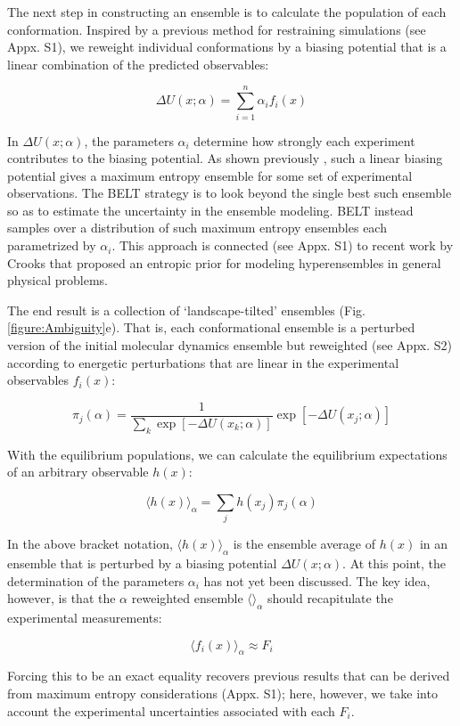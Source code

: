 \documentclass[12pt]{article}
\begin{document}
The next step in constructing an ensemble is to calculate the population of each conformation.  Inspired by a previous method for restraining simulations  \cite{chodera2012} (see Appx. S1), we reweight individual conformations by a biasing potential that is a linear combination of the predicted observables:

$$\Delta U(x;\alpha) = \sum_{i=1}^n \alpha_i f_i(x)$$

In $\Delta U(x;\alpha)$, the parameters $\alpha_i$ determine how strongly each experiment contributes to the biasing potential.  As shown previously \cite{chodera2012}, such a linear biasing potential gives a maximum entropy ensemble for some set of experimental observations. The BELT strategy is to look beyond the single best such ensemble so as to estimate the uncertainty in the ensemble modeling. BELT instead samples over a distribution of such maximum entropy ensembles each parametrized by $\alpha_i$. This approach is connected (see Appx. S1) to recent work by Crooks that proposed an entropic prior for modeling hyperensembles in general physical problems. 

The end result is a collection of `landscape-tilted' ensembles (Fig. \ref{figure:Ambiguity}e). That is, each conformational ensemble is a perturbed version of the initial molecular dynamics ensemble but reweighted (see Appx. S2) according to energetic perturbations that are linear in the experimental observables $f_i(x)$:

$$\pi_j(\alpha) = \frac{1}{\sum_k \exp[-\Delta U(x_k;\alpha)]} \exp[-\Delta U(x_j;\alpha)]$$

With the equilibrium populations, we can calculate the equilibrium expectations of an arbitrary observable $h(x)$:

$$\langle h(x)\rangle _\alpha = \sum_j h(x_j) \pi_j(\alpha)$$

In the above bracket notation, $\langle h(x)\rangle _\alpha$ is the ensemble average of $h(x)$ in an ensemble that is perturbed by a biasing potential $\Delta U(x;\alpha)$.  At this point, the determination of the parameters $\alpha_i$ has not yet been discussed.  The key idea, however, is that the $\alpha$ reweighted ensemble $\langle \rangle _\alpha$ should recapitulate the experimental measurements:

$$\langle f_i(x)\rangle _\alpha \approx F_i$$

Forcing this to be an exact equality recovers previous results \cite{chodera2012} that can be derived from maximum entropy considerations (Appx. S1); here, however, we take into account the experimental uncertainties associated with each $F_i$.  
\end{document}
